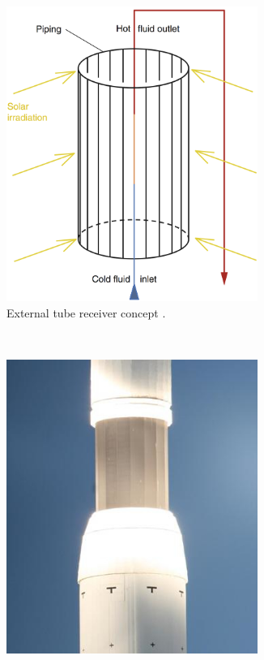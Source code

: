 \documentclass[Master,MEE,english]{twbook}%
\begin{document}
\begin{figure}[!htbp]
        \centering
        \begin{subfigure}[b]{0.5\textwidth}
                \centering
                \includegraphics[width=0.9\textwidth]{FIG/TubeReceiver}
                \caption{External tube receiver concept \cite{Alexopoulos2013}.}\label{TubeReceiver}
        \end{subfigure}%
        ~
        \begin{subfigure}[b]{0.5\textwidth}
                \centering
                \includegraphics[width=0.9\textwidth]{FIG/Gemasolar_tower_heatshield}

\end{subfigure}
\end{figure}
\end{document}
